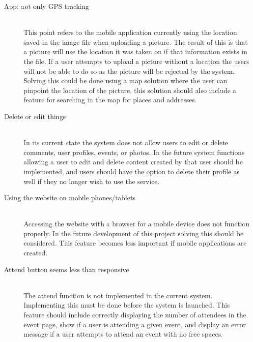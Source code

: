 \begin{description}
  \item[App: not only GPS tracking] \hfill \\ This point refers to the mobile application currently using the location saved in the image file when uploading a picture. The result of this is that a picture will use the location it was taken on if that information exists in the file. If a user attempts to upload a picture without a location the users will not be able to do so as the picture will be rejected by the system. Solving this could be done using a map solution where the user can pinpoint the location of the picture, this solution should also include a feature for searching in the map for places and addresses.
  \item[Delete or edit things] \hfill \\ In its current state the system does not allow users to edit or delete comments, user profiles, events, or photos. In the future system functions allowing a user to edit and delete content created by that user should be implemented, and users should have the option to delete their profile as well if they no longer wish to use the service.
  \item[Using the website on mobile phones/tablets] \hfill \\ Accessing the website with a browser for a mobile device does not function properly. In the future development of this project solving this should be considered. This feature becomes less important if mobile applications are created.
  \item[Attend button seems less than responsive] \hfill \\ The attend function is not implemented in the current system. Implementing this must be done before the system is launched. This feature should include correctly displaying the number of attendees in the event page, show if a user is attending a given event, and display an error message if a user attempts to attend an event with no free spaces.
\end{description}

